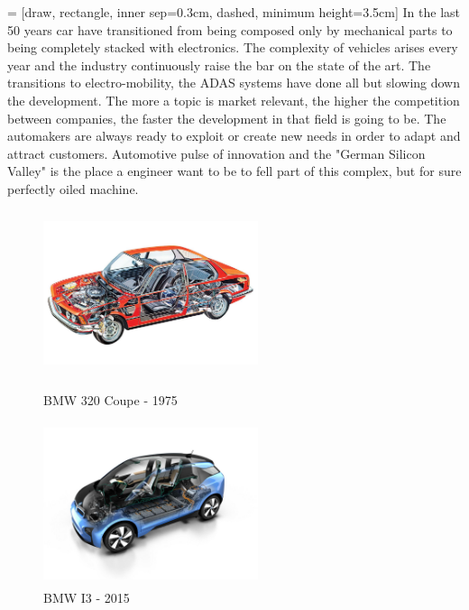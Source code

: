 \documentclass[../main.tex]{subfiles}
\begin{document}
 = [draw, rectangle, inner sep=0.3cm, dashed, minimum height=3.5cm]
In the last 50 years car have transitioned from being composed only by mechanical parts to being completely stacked with electronics. The complexity of vehicles arises every year and the industry continuously raise the bar on the state of the art. The transitions to electro-mobility, the \gls{ADAS} systems have done all but slowing down the development. The more a topic is market relevant, the higher the competition between companies, the faster the development in that field is going to be. The automakers are always ready to exploit or create new needs in order to adapt and attract customers. Automotive pulse of innovation and the "German Silicon Valley" is the place a engineer want to be to fell part of this complex, but for sure perfectly oiled machine.   
\begin{figure}
\centering
\begin{minipage}{.5\textwidth}
  \centering
  \includegraphics[width=6.3cm, height=4.8cm]{images_folder/4a56e1d50b56da42a10e29d451cf2b93.jpg}
  \caption{\gls{BMW} 320 Coupe - 1975}
  \label{fig:test1}
\end{minipage}%
\begin{minipage}{.5\textwidth}
  \centering
  \includegraphics[width=6.3cm, height=4.8cm]{images_folder/BMW_i3.jpg}
  \caption{\gls{BMW} I3 - 2015}
  \label{fig:test2}
\end{minipage}
\end{figure}
\end{document}
